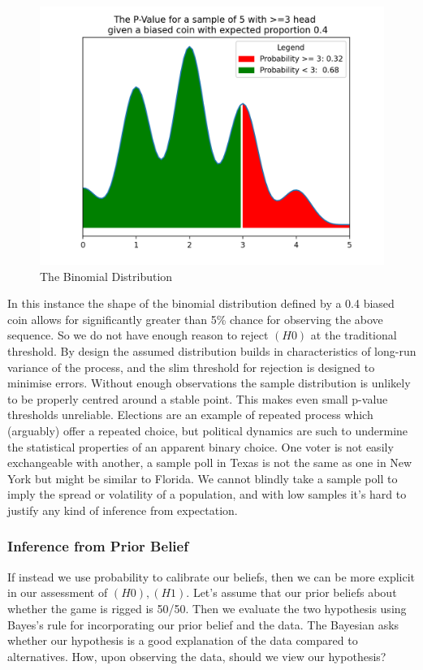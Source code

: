 \documentclass[10pt,a4paper,notitlepage, twocolumn]{article}
\begin{document}
\begin{figure}[H]
  \includegraphics[width=\linewidth]{./Plots/binomial_test.png}
  \caption{The Binomial Distribution}
\end{figure}

In this instance the shape of the binomial distribution defined by a 0.4 biased coin allows for significantly greater than  5\% chance for observing the above sequence. So we do not have enough reason to reject $(H0)$ at the traditional threshold. By design the assumed distribution builds in characteristics of long-run variance of the process, and the slim threshold for rejection is designed to minimise errors. Without enough observations the sample distribution is unlikely to be properly centred around a stable point. This makes even small p-value thresholds unreliable. Elections are an example of repeated process which (arguably) offer a repeated choice, but political dynamics are such to undermine the statistical properties of an apparent binary choice. One voter is not easily exchangeable with another, a sample poll in Texas is not the same as one in New York but might be similar to Florida. We cannot blindly take a sample poll to imply the spread or volatility of a population, and with low samples it's hard to justify any kind of inference from expectation.

\subsubsection*{Inference from Prior Belief}
If instead we use probability to calibrate our beliefs, then we can be more explicit in our assessment of $(H0), (H1)$. Let's assume that our prior beliefs about whether the game is rigged is 50/50. Then we evaluate the two hypothesis using Bayes's rule for incorporating our prior belief and the data. The Bayesian asks whether our hypothesis is a good explanation of the data compared to alternatives. How, upon observing the data, should we view our hypothesis?
\end{document}
